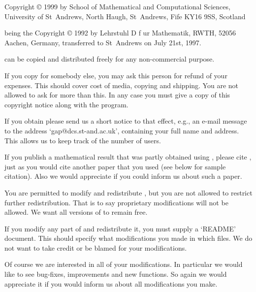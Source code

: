 


Copyright {\copyright} 1999 by
        School of Mathematical and Computational Sciences,
        University of St~Andrews,
        North Haugh, St~Andrews, Fife KY16 9SS, Scotland

being the Copyright {\copyright} 1992 by
        Lehrstuhl D f{ u}r Mathematik, RWTH,
        52056 Aachen, Germany,
transferred to St~Andrews on July 21st, 1997.

\medskip

{\GAP}   can be copied   and  distributed freely  for any  non-commercial
purpose.

If you copy {\GAP} for somebody else, you may ask this person for  refund
of your expenses.  This should cover cost of media, copying and shipping.
You are not allowed to ask for more than this.  In any case you must give
a copy of this copyright notice along with the program.

If you obtain {\GAP} please send us  a short notice to that effect, e.g.,
an  e-mail  message   to  the  address  `gap@dcs.st-and.ac.uk',
containing your full  name and address.  This  allows us to keep track of
the number of {\GAP} users.

If you  publish  a mathematical  result  that  was  partly obtained using
{\GAP}, please cite {\GAP}, just as you would cite another paper that you
used (see below for sample citation). Also   we would appreciate if you
could inform us  about such a paper.

You  are permitted  to modify and  redistribute  {\GAP},  but you are not
allowed  to restrict further redistribution.  That is to say  proprietary
modifications will  not  be allowed.  We want all  versions  of {\GAP} to
remain free.

If you  modify any part of {\GAP} and redistribute it,  you must supply a
`README'  document.   This should specify what modifications you made  in
which  files.  We do  not  want  to take  credit  or  be blamed  for your
modifications.

Of course we are interested in all of your modifications.  In  particular
we would like to see bug-fixes, improvements and new functions.  So again
we would appreciate it if you would inform us about all modifications you
make.

